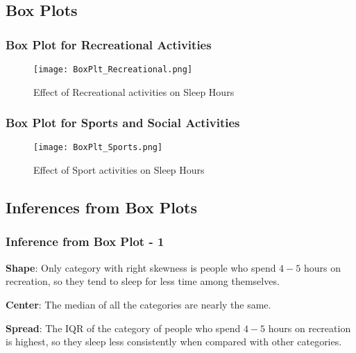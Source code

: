 \documentclass[11pt,]{beamer}
\begin{document}
\subsection{Box Plots}

\begin{frame}
	\frametitle{Box Plot for Recreational Activities}
	
    \begin{figure}
		\texttt{[image: BoxPlt\_Recreational.png]}
		\caption{Effect of Recreational activities on Sleep Hours}
	\end{figure}
	
\end{frame}

\begin{frame}
	\frametitle{Box Plot for Sports and Social Activities}
	
	\begin{figure}
		\texttt{[image: BoxPlt\_Sports.png]}
		\caption{Effect of Sport activities on Sleep Hours}
	\end{figure}

\end{frame}

\subsection{Inferences from Box Plots}

\begin{frame}

    \frametitle{Inference from Box Plot - 1}
    
    \textbf{Shape}: Only category with right skewness is people who spend $4-5$ hours on recreation, so they tend to sleep for less time among themselves. 
    
    \bigskip
    
    \textbf{Center}:  The median of all the categories are nearly the same.
    
    \bigskip
    
    \textbf{Spread}: The IQR of the category of people who spend $4-5$ hours on recreation is highest, so they sleep less consistently when compared with other categories.
    
\end{frame}
\end{document}

